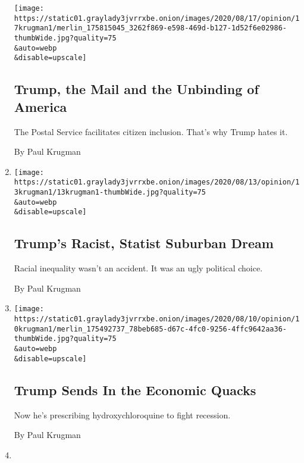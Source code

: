 \begin{enumerate}
  \texttt{[image: https://static01.graylady3jvrrxbe.onion/images/2020/08/17/opinion/17krugman1/merlin\_175815045\_3262f869-e598-469d-b127-1d52f6e02986-thumbWide.jpg?quality=75\\\&auto=webp\\\&disable=upscale]}

  \hypertarget{trump-the-mail-and-the-unbinding-of-america}{%
  \subsection{Trump, the Mail and the Unbinding of
  America}\label{trump-the-mail-and-the-unbinding-of-america}}

  The Postal Service facilitates citizen inclusion. That's why Trump
  hates it.

  By Paul Krugman
\item
  \href{/2020/08/13/opinion/trump-suburbs-racism.html}{}

  \texttt{[image: https://static01.graylady3jvrrxbe.onion/images/2020/08/13/opinion/13krugman1/13krugman1-thumbWide.jpg?quality=75\\\&auto=webp\\\&disable=upscale]}

  \hypertarget{trumps-racist-statist-suburban-dream}{%
  \subsection{Trump's Racist, Statist Suburban
  Dream}\label{trumps-racist-statist-suburban-dream}}

  Racial inequality wasn't an accident. It was an ugly political choice.

  By Paul Krugman
\item
  \href{/2020/08/10/opinion/trump-coronavirus-social-security.html}{}

  \texttt{[image: https://static01.graylady3jvrrxbe.onion/images/2020/08/10/opinion/10krugman1/merlin\_175492737\_78beb685-d67c-4fc0-9256-4ffc9642aa36-thumbWide.jpg?quality=75\\\&auto=webp\\\&disable=upscale]}

  \hypertarget{trump-sends-in-the-economic-quacks}{%
  \subsection{Trump Sends In the Economic
  Quacks}\label{trump-sends-in-the-economic-quacks}}

  Now he's prescribing hydroxychloroquine to fight recession.

  By Paul Krugman
\item
  \href{/2020/08/06/opinion/coronavirus-us-recession.html}{}


\end{enumerate}
